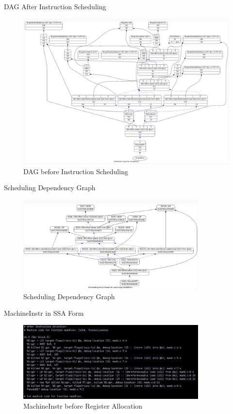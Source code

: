\begin{frame}{DAG After Instruction Scheduling}
    \begin{figure}
    \centering
    \includegraphics[height=0.75\textheight]{path_instruction/madd_dag_sched.png}
    \caption{DAG before Instruction Scheduling}
    \label{fig:dag_sched}
\end{figure}
\end{frame}

\begin{frame}{Scheduling Dependency Graph}
    \begin{figure}
    \centering
    \includegraphics[width=0.85\textwidth]{path_instruction/madd_dag_sunit.png}
    \caption{Scheduling Dependency Graph}
    \label{fig:sunit}
\end{figure}
\end{frame}

\begin{frame}{MachineInstr in SSA Form}
    \begin{figure}
    \centering
    \includegraphics[width=0.85\textwidth]{path_instruction/madd_MachineInstruction.png}
    \caption{MachineInstr before Register Allocation}
    \label{fig:mc_inst}
\end{figure}
\end{frame}


